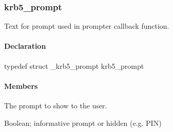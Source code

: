 \documentclass[letterpaper,10pt,english]{sphinxmanual}
\begin{document}

\begin{fulllineitems}
\label{appdev/refs/types/krb5_const_principal:krb5_const_principal.type}
\end{fulllineitems}



\subsubsection{krb5\_prompt}
\label{appdev/refs/types/krb5_prompt:krb5-prompt}\label{appdev/refs/types/krb5_prompt::doc}\label{appdev/refs/types/krb5_prompt:krb5-prompt-struct}

\begin{fulllineitems}
\label{appdev/refs/types/krb5_prompt:krb5_prompt}
\end{fulllineitems}


Text for prompt used in prompter callback function.


\paragraph{Declaration}
\label{appdev/refs/types/krb5_prompt:declaration}
typedef struct \_krb5\_prompt  krb5\_prompt


\paragraph{Members}
\label{appdev/refs/types/krb5_prompt:members}

\begin{fulllineitems}
\label{appdev/refs/types/krb5_prompt:krb5_prompt.prompt}
The prompt to show to the user.

\end{fulllineitems}


\begin{fulllineitems}
\label{appdev/refs/types/krb5_prompt:krb5_prompt.hidden}
Boolean; informative prompt or hidden (e.g.
PIN)

\end{fulllineitems}
\end{document}
